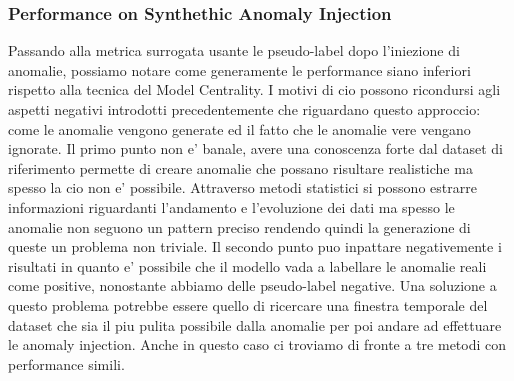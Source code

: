 \subsubsection{Performance on Synthethic Anomaly Injection}
Passando alla metrica surrogata usante le pseudo-label dopo l'iniezione di anomalie, possiamo notare come generamente le performance siano inferiori rispetto alla tecnica del Model Centrality. I motivi di cio possono ricondursi agli aspetti negativi introdotti precedentemente che riguardano questo approccio: come le anomalie vengono generate ed il fatto che le anomalie vere vengano ignorate. Il primo punto non e' banale, avere una conoscenza forte dal dataset di riferimento permette di creare anomalie che possano risultare realistiche ma spesso la cio non e' possibile. Attraverso metodi statistici si possono estrarre informazioni riguardanti l'andamento e l'evoluzione dei dati ma spesso le anomalie non seguono un pattern preciso rendendo quindi la generazione di queste un problema non triviale. Il secondo punto puo inpattare negativemente i risultati in quanto e' possibile che il modello vada a labellare le anomalie reali come positive, nonostante abbiamo delle pseudo-label negative. Una soluzione a questo problema potrebbe essere quello di ricercare una finestra temporale del dataset che sia il piu pulita possibile dalla anomalie per poi andare ad effettuare le anomaly injection.
Anche in questo caso ci troviamo di fronte a tre metodi con performance simili. 
